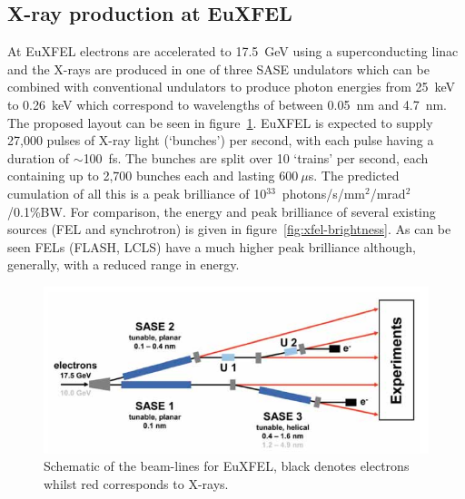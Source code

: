 \subsection{X-ray production at EuXFEL} %
\label{sub:x_ray_production_at_euxfel}
At EuXFEL electrons are accelerated to 17.5~GeV using a superconducting linac and the X-rays are produced in one of three SASE undulators which can be combined with conventional undulators to produce photon energies from 25~keV to 0.26~keV which correspond to wavelengths of between 0.05~nm and 4.7~nm. The proposed layout can be seen in figure~\ref{fig:XFEL_layout}. EuXFEL is expected to supply 27,000 pulses of X-ray light (`bunches') per second, with each pulse having a duration of \( \sim \)100~fs. The bunches are split over 10 `trains' per second, each containing up to 2,700 bunches each and lasting \( 600~\mu\)s. The predicted cumulation of all this is a peak brilliance of 10\(^{33}\)~photons/s/mm\(^2\)/mrad\(^2\)/0.1\%BW. For comparison, the energy and peak brilliance of several existing sources (FEL and synchrotron) is given in figure~\ref{fig:xfel-brightness}. As can be seen FELs (FLASH, LCLS) have a much higher peak brilliance although, generally, with a reduced range in energy.
\begin{figure}[htbp]
  \centering
    \includegraphics[width=.9\textwidth]{images/Other/XFEL_layout.png}
  \caption{Schematic of the beam-lines for EuXFEL, black denotes electrons whilst red corresponds to X-rays.}
  \label{fig:XFEL_layout}
\end{figure}

